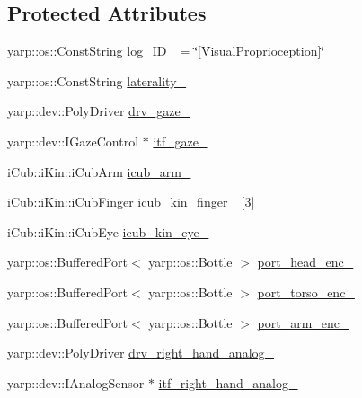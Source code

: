 \subsection*{Protected Attributes}
\begin{DoxyCompactItemize}
\item 
yarp\+::os\+::\+Const\+String \hyperlink{classVisualProprioception_ac23b912f12c8c4b639d12f343ca4fef4}{log\+\_\+\+I\+D\+\_\+} = \char`\"{}\mbox{[}Visual\+Proprioception\mbox{]}\char`\"{}
\item 
yarp\+::os\+::\+Const\+String \hyperlink{classVisualProprioception_a03d34b9887450f1def5b22b3358ea99c}{laterality\+\_\+}
\item 
yarp\+::dev\+::\+Poly\+Driver \hyperlink{classVisualProprioception_a73058b557c8169f92920f599ff0f7319}{drv\+\_\+gaze\+\_\+}
\item 
yarp\+::dev\+::\+I\+Gaze\+Control $\ast$ \hyperlink{classVisualProprioception_a775bf77a04b5c23488e53a58b47d7e20}{itf\+\_\+gaze\+\_\+}
\item 
i\+Cub\+::i\+Kin\+::i\+Cub\+Arm \hyperlink{classVisualProprioception_a4031f349da8660db553cccf2e2eed709}{icub\+\_\+arm\+\_\+}
\item 
i\+Cub\+::i\+Kin\+::i\+Cub\+Finger \hyperlink{classVisualProprioception_a629e04a45391f571094e4ae8a8dedbff}{icub\+\_\+kin\+\_\+finger\+\_\+} \mbox{[}3\mbox{]}
\item 
i\+Cub\+::i\+Kin\+::i\+Cub\+Eye \hyperlink{classVisualProprioception_ab19c8d684a0be7316a4dbb4e528ea784}{icub\+\_\+kin\+\_\+eye\+\_\+}
\item 
yarp\+::os\+::\+Buffered\+Port$<$ yarp\+::os\+::\+Bottle $>$ \hyperlink{classVisualProprioception_a1499b951384754d12a31c66fd88385b9}{port\+\_\+head\+\_\+enc\+\_\+}
\item 
yarp\+::os\+::\+Buffered\+Port$<$ yarp\+::os\+::\+Bottle $>$ \hyperlink{classVisualProprioception_acc3edbcc142167ccd748b1953fd08983}{port\+\_\+torso\+\_\+enc\+\_\+}
\item 
yarp\+::os\+::\+Buffered\+Port$<$ yarp\+::os\+::\+Bottle $>$ \hyperlink{classVisualProprioception_a9cafb14a81554af9192456cf2f29f12b}{port\+\_\+arm\+\_\+enc\+\_\+}
\item 
yarp\+::dev\+::\+Poly\+Driver \hyperlink{classVisualProprioception_af3518d76b3cac4b3fbfcb3b89ce695f1}{drv\+\_\+right\+\_\+hand\+\_\+analog\+\_\+}
\item 
yarp\+::dev\+::\+I\+Analog\+Sensor $\ast$ \hyperlink{classVisualProprioception_a16a22e76ad42cd33fbeacd47aa408a74}{itf\+\_\+right\+\_\+hand\+\_\+analog\+\_\+}

\end{DoxyCompactItemize}
